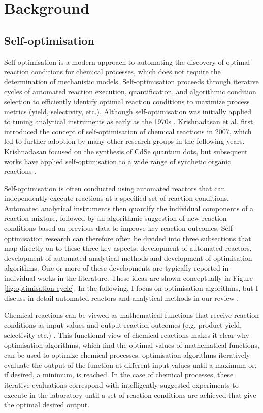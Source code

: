 \section{Background}

\subsection{Self-optimisation}

Self-optimisation is a modern approach to automating the discovery of optimal reaction conditions for chemical processes, which does not require the determination of mechanistic models. Self-optimisation proceeds through iterative cycles of automated reaction execution, quantification, and algorithmic condition selection to efficiently identify optimal reaction conditions to maximize process metrics (yield, selectivity, etc.). Although self-optimisation was initially applied to tuning analytical instruments as early as the 1970s \cite{Routh1977}. Krishnadasan et al. \cite{Krishnadasan2007} first introduced the concept of self-optimisation of chemical reactions in 2007, which led to further adoption by many other research groups in the following years. Krishnadasan focused on the synthesis of CdSe quantum dots, but subsequent works have applied self-optimisation to a wide range of synthetic organic reactions \cite{McMullen2010a, McMullen2011, Bourne2011, Moore2012, christensen2021, Reizman2016b, Fitzpatrick2016,Echtermeyer2017}.

Self-optimisation is often conducted using automated reactors that can independently execute reactions at a specified set of reaction conditions. Automated analytical instruments then quantify the individual components of a reaction mixture, followed by an algorithmic suggestion of new reaction conditions based on previous data to improve key reaction outcomes. Self-optimisation research can therefore often be divided into three subsections that map directly on to these three key aspects: development of automated reactors, development of automated analytical methods and development of optimisation algorithms. One or more of these developments are typically reported in individual works in the literature. These ideas are shown conceptually in Figure \ref{fig:optimisation-cycle}.  In the following, I focus on optimisation algorithms, but I discuss in detail automated reactors and analytical methods in our review \cite{Taylor2023a}.

Chemical reactions can be viewed as mathematical functions that receive reaction conditions as input values and output reaction outcomes (e.g. product yield, selectivity etc.) \cite{Clayton2019}. This functional view of chemical reactions makes it clear why optimisation algorithms, which find the optimal values of mathematical functions, can be used to optimize chemical processes. optimisation algorithms iteratively evaluate the output of the function at different input values until a maximum or, if desired, a minimum, is reached. In the case of chemical processes, these iterative evaluations correspond with intelligently suggested experiments to execute in the laboratory until a set of reaction conditions are achieved that give the optimal desired output.

